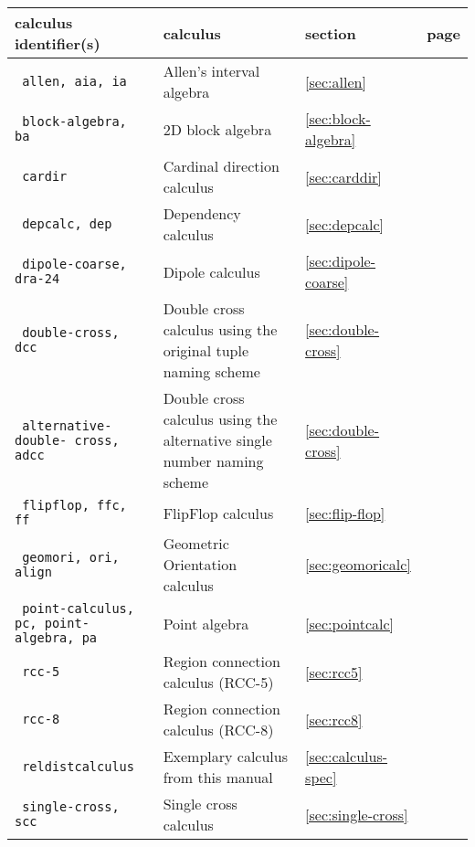 \documentclass[headsepline]{scrreprt}
\theoremstyle{definition}
\begin{document}
\begin{center}
\begin{longtable}{|p{4cm}p{6cm}ll|}\hline
	{\bfseries calculus identifier(s)} & {\bfseries calculus} & {\bfseries section} & {\bfseries page}\\ \hline \hline
%
	\texttt{ allen, aia, ia} & Allen's interval algebra \citep{allen83} & \ref{sec:allen} & \pageref{sec:allen} \\
	\texttt{ block-algebra, ba} & 2D block algebra \citep{guesgen:89} & \ref{sec:block-algebra} & \pageref{sec:block-algebra}\\
	\texttt{ cardir} & Cardinal direction calculus \citep{ligozat98_carddir}  & \ref{sec:carddir} & \pageref{sec:carddir} \\
	\texttt{ depcalc, dep} & Dependency calculus \citep{Ragni05_DepCalc} & \ref{sec:depcalc} & \pageref{sec:depcalc} \\
	\texttt{ dipole-coarse, dra-24} & Dipole calculus \citep{moratz-renz-wolter-ECAI:00} & \ref{sec:dipole-coarse} & \pageref{sec:dipole-coarse} \\
	\texttt{ double-cross, dcc} & Double cross calculus \citep{cosyfre92} using the original tuple naming scheme & \ref{sec:double-cross} & \pageref{sec:double-cross} \\
	\texttt{ alternative-double- cross, adcc} & Double cross calculus \citep{cosyfre92} using the alternative single number naming scheme & \ref{sec:double-cross} & \pageref{sec:double-cross} \\
	\texttt{ flipflop, ffc, ff} & FlipFlop calculus \citep{Ligozat93_FlipFlopCalculus}& \ref{sec:flip-flop} & \pageref{sec:flip-flop} \\
	\texttt{ geomori, ori, align} & Geometric Orientation calculus & \ref{sec:geomoricalc} & \pageref{sec:geomoricalc} \\
	\texttt{ point-calculus, pc, point-algebra, pa} & Point algebra \citep{vilain_kautz_beek_89_constraint} & \ref{sec:pointcalc} & \pageref{sec:pointcalc} \\
	\texttt{ rcc-5} & Region connection calculus (RCC-5) \citep{randell92_rccb} & \ref{sec:rcc5} & \pageref{sec:rcc5} \\
	\texttt{ rcc-8} & Region connection calculus (RCC-8) \citep{randell92_rccb} & \ref{sec:rcc8} & \pageref{sec:rcc8} \\
	\texttt{ reldistcalculus} & Exemplary calculus from this manual & \ref{sec:calculus-spec} & \pageref{sec:calculus-spec}\\
	\texttt{ single-cross, scc} & Single cross calculus \citep{cosyfre92} & \ref{sec:single-cross} & \pageref{sec:single-cross} \\

\end{longtable}
\end{center}
\end{document}
